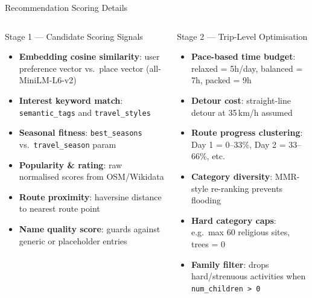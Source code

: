 \documentclass[aspectratio=169,professionalfonts]{beamer}
\newcommand{\hl}[1]{\textbf{\textcolor{ysblue}{#1}}}
\begin{document}
\begin{frame}{Recommendation Scoring Details}
  \begin{columns}[T]
    \begin{block}{Stage 1 — Candidate Scoring Signals}
      \begin{itemize}
        \item \hl{Embedding cosine similarity}: user preference vector vs.\ place vector (all-MiniLM-L6-v2)
        \item \hl{Interest keyword match}: \texttt{semantic\_tags} and \texttt{travel\_styles}
        \item \hl{Seasonal fitness}: \texttt{best\_seasons} vs.\ \texttt{travel\_season} param
        \item \hl{Popularity \& rating}: raw normalised scores from OSM/Wikidata
        \item \hl{Route proximity}: haversine distance to nearest route point
        \item \hl{Name quality score}: guards against generic or placeholder entries
      \end{itemize}
    \end{block}

    \begin{block}{Stage 2 — Trip-Level Optimisation}
      \begin{itemize}
        \item \hl{Pace-based time budget}: relaxed = 5h/day, balanced = 7h, packed = 9h
        \item \hl{Detour cost}: straight-line detour at 35\,km/h assumed
        \item \hl{Route progress clustering}: Day 1 = 0--33\%, Day 2 = 33--66\%, etc.
        \item \hl{Category diversity}: MMR-style re-ranking prevents flooding
        \item \hl{Hard category caps}: e.g.\ max 60 religious sites, trees = 0
        \item \hl{Family filter}: drops hard/strenuous activities when \texttt{num\_children > 0}
      \end{itemize}
    \end{block}
  \end{columns}
\end{frame}
\end{document}
